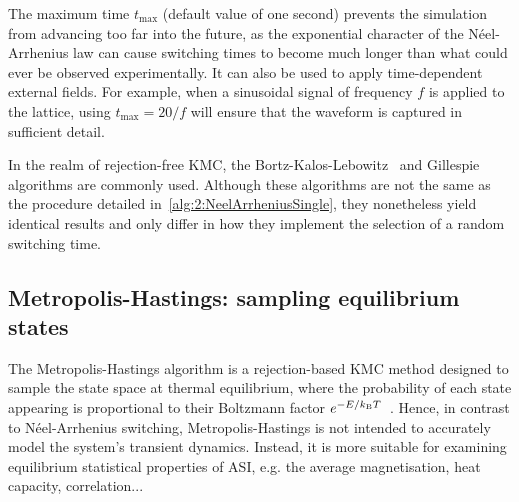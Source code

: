 The maximum time $t_\mathrm{max}$ (default value of one second) prevents the simulation from advancing too far into the future, as the exponential character of the N\'eel-Arrhenius law can cause switching times to become much longer than what could ever be observed experimentally.
It can also be used to apply time-dependent external fields.
For example, when a sinusoidal signal of frequency $f$ is applied to the lattice, using $t_{\mathrm{max}}=20/f$ will ensure that the waveform is captured in sufficient detail. \par
In the realm of rejection-free KMC, the Bortz-Kalos-Lebowitz~\cite{nfoldMCalgorithm} and Gillespie~\cite{gillespie1976general} algorithms are commonly used.
Although these algorithms are not the same as the procedure detailed in~\cref{alg:2:NeelArrheniusSingle}, they nonetheless yield identical results and only differ in how they implement the selection of a random switching time.

\subsection{Metropolis-Hastings: sampling equilibrium states} \label{sec:2:Dynamics_MH}
The Metropolis-Hastings algorithm is a rejection-based KMC method designed to sample the state space at thermal equilibrium, where the probability of each state appearing is proportional to their Boltzmann factor $e^{-E/\kBT}$~\cite{IntroductionMC,kyimba2006comparisonIsingAlgorithms}.
Hence, in contrast to N\'eel-Arrhenius switching, Metropolis-Hastings is not intended to accurately model the system's transient dynamics.
Instead, it is more suitable for examining equilibrium statistical properties of ASI, e.g. the average magnetisation, heat capacity, correlation...~\cite{ApparentFMpinwheel} \par

